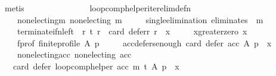 \begin{isabellebody}
\ metis\isanewline
\ \ \ \ \ \ \isamarkupfalse%
\isanewline
\ \ \ \ \isamarkupfalse%
\isanewline
\ \ \isamarkupfalse%
\isanewline
{}\isamarkupfalse%
%
\endisatagproof
{\isafoldproof}%
%
\isadelimproof
\isanewline
%
\endisadelimproof
\isanewline
{}\isamarkupfalse%
\ loop{\isacharunderscore}{\kern0pt}comp{\isacharunderscore}{\kern0pt}helper{\isacharunderscore}{\kern0pt}iter{\isacharunderscore}{\kern0pt}elim{\isacharunderscore}{\kern0pt}def{\isacharunderscore}{\kern0pt}n{\isacharcolon}{\kern0pt}\isanewline
\ \ \isanewline
\ \ \ \ non{\isacharunderscore}{\kern0pt}electing{\isacharunderscore}{\kern0pt}m{\isacharcolon}{\kern0pt}\ {\isachardoublequoteopen}non{\isacharunderscore}{\kern0pt}electing\ m{\isachardoublequoteclose}\ \isanewline
\ \ \ \ single{\isacharunderscore}{\kern0pt}elimination{\isacharcolon}{\kern0pt}\ {\isachardoublequoteopen}eliminates\ {}\ m{\isachardoublequoteclose}\ \isanewline
\ \ \ \ terminate{\isacharunderscore}{\kern0pt}if{\isacharunderscore}{\kern0pt}n{\isacharunderscore}{\kern0pt}left{\isacharcolon}{\kern0pt}\ {\isachardoublequoteopen}{\isasymforall}\ r{\isachardot}{\kern0pt}\ {\isacharparenleft}{\kern0pt}{\isacharparenleft}{\kern0pt}t\ r{\isacharparenright}{\kern0pt}\ {\isasymlongleftrightarrow}\ {\isacharparenleft}{\kern0pt}card\ {\isacharparenleft}{\kern0pt}defer{\isacharunderscore}{\kern0pt}r\ r{\isacharparenright}{\kern0pt}\ {\isacharequal}{\kern0pt}\ x{\isacharparenright}{\kern0pt}{\isacharparenright}{\kern0pt}{\isachardoublequoteclose}\ \isanewline
\ \ \ \ x{\isacharunderscore}{\kern0pt}greater{\isacharunderscore}{\kern0pt}zero{\isacharcolon}{\kern0pt}\ {\isachardoublequoteopen}x\ {\isachargreater}{\kern0pt}\ {}{\isachardoublequoteclose}\ \isanewline
\ \ \ \ f{\isacharunderscore}{\kern0pt}prof{\isacharcolon}{\kern0pt}\ {\isachardoublequoteopen}finite{\isacharunderscore}{\kern0pt}profile\ A\ p{\isachardoublequoteclose}\ \isanewline
\ \ \ \ acc{\isacharunderscore}{\kern0pt}defers{\isacharunderscore}{\kern0pt}enough{\isacharcolon}{\kern0pt}\ {\isachardoublequoteopen}card\ {\isacharparenleft}{\kern0pt}defer\ acc\ A\ p{\isacharparenright}{\kern0pt}\ {\isasymge}\ x{\isachardoublequoteclose}\ \isanewline
\ \ \ \ non{\isacharunderscore}{\kern0pt}electing{\isacharunderscore}{\kern0pt}acc{\isacharcolon}{\kern0pt}\ {\isachardoublequoteopen}non{\isacharunderscore}{\kern0pt}electing\ acc{\isachardoublequoteclose}\isanewline
\ \ \ {\isachardoublequoteopen}card\ {\isacharparenleft}{\kern0pt}defer\ {\isacharparenleft}{\kern0pt}loop{\isacharunderscore}{\kern0pt}comp{\isacharunderscore}{\kern0pt}helper\ acc\ m\ t{\isacharparenright}{\kern0pt}\ A\ p{\isacharparenright}{\kern0pt}\ {\isacharequal}{\kern0pt}\ x{\isachardoublequoteclose}\isanewline

\end{isabellebody}
